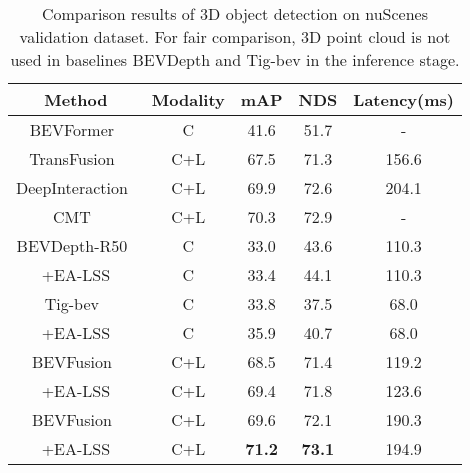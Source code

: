 \documentclass[letterpaper]{article} \usepackage[submission]{aaai24}  \usepackage{times}  \usepackage{helvet}  \usepackage{courier}  \usepackage[hyphens]{url}  \usepackage{graphicx} \urlstyle{rm} \def\UrlFont{\rm}  \usepackage{natbib}  \usepackage{caption} \frenchspacing  \setlength{\pdfpagewidth}{8.5in} \setlength{\pdfpageheight}{11in} \usepackage{algorithm}
\begin{document}
\begin{table*}
\begin{center}
\small
\begin{tabular}{c|c|ccc}
\hline
Method & Modality & mAP  & NDS & Latency(ms)\\
\hline
BEVFormer~\cite{li2022bevformer} & C &  41.6  & 51.7 & -  \\
TransFusion~\cite{bai2022transfusion} & C+L  &	67.5 &	71.3 & 156.6 \\
DeepInteraction~\cite{yang2022deepinteraction} & C+L  &	69.9 &	72.6 &	204.1 \\
CMT~\cite{yan2023cmt} & C+L  &	70.3 &	72.9 &	- \\
\hline
BEVDepth-R50~\cite{li2022bevdepth} & C &	33.0 & 43.6 & 110.3 \\
+EA-LSS  & C  & 33.4 & 44.1 & 110.3 \\

Tig-bev~\cite{huang2022tigbev} & C &	33.8 & 37.5 & 68.0 \\
+EA-LSS  & C  & 35.9 & 40.7 & 68.0 \\
\hline
BEVFusion~\cite{liu2022bevfusion} & C+L  &	 68.5 & 71.4 & 119.2 \\
+EA-LSS & C+L  & 69.4 & 71.8 & 123.6 \\	

BEVFusion~\cite{liang2022bevfusion} & C+L &	69.6  & 72.1 & 190.3 \\
+EA-LSS  & C+L & \textbf{71.2}  &  \textbf{73.1} & 194.9 \\	
\hline
\end{tabular}
\end{center}
\caption{Comparison results of 3D object detection on nuScenes validation dataset. For fair comparison, 3D point cloud is not used in baselines BEVDepth and Tig-bev in the inference stage.}
\label{table:detection_val}
\end{table*}
\end{document}
